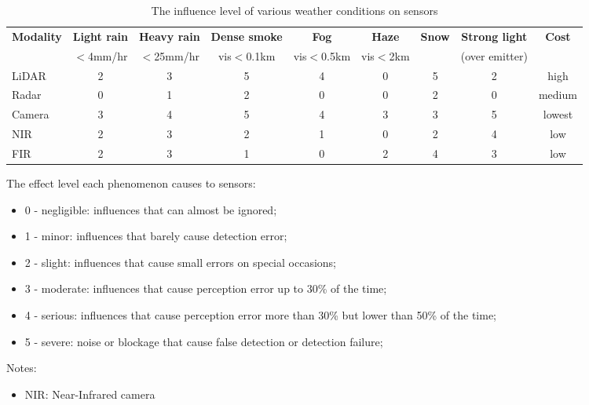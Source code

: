 \documentclass[report.tex]{subfiles}
\begin{document}
    \begin{table}
        \centering
        \caption{The influence level of various weather conditions on sensors \cite{zhang2023perception}}
        \begin{tabular}{|l|c|c|c|c|c|c|c|c|}
        \hline
        \textbf{Modality} & \textbf{Light rain} & \textbf{Heavy rain} & \textbf{Dense smoke} & \textbf{Fog} & \textbf{Haze} & \textbf{Snow} & \textbf{Strong light} & \textbf{Cost} \\
        & $<$4mm/hr & $<$25mm/hr & vis$<$0.1km & vis$<$0.5km & vis$<$2km & & (over emitter) & \\
        \hline
        LiDAR & 2 & 3 & 5 & 4 & 0 & 5 & 2 & high \\
        \hline
        Radar & 0 & 1 & 2 & 0 & 0 & 2 & 0 & medium \\
        \hline
        Camera & 3 & 4 & 5 & 4 & 3 & 3 & 5 & lowest\\
        \hline
        NIR & 2 & 3 & 2 & 1 & 0 & 2 & 4 & low \\
        \hline
        FIR & 2 & 3 & 1 & 0 & 2 & 4 & 3 & low \\
        \hline
        \end{tabular}
        \label{table:quantitative_effect_of_weather}
        \begin{tablenotes}
            \small
            \item The effect level each phenomenon causes to sensors:
            \begin{itemize}
                \item 0 - negligible: influences that can almost be ignored;
                \item 1 - minor: influences that barely cause detection error;
                \item 2 - slight: influences that cause small errors on special occasions;
                \item 3 - moderate: influences that cause perception error up to 30\% of the time;
                \item 4 - serious: influences that cause perception error more than 30\% but lower than 50\% of the time;
                \item 5 - severe: noise or blockage that cause false detection or detection failure;
            \end{itemize}
            \item Notes:
            \begin{itemize}
                \item NIR: Near-Infrared camera

\end{itemize}
\end{tablenotes}
\end{table}
\end{document}
